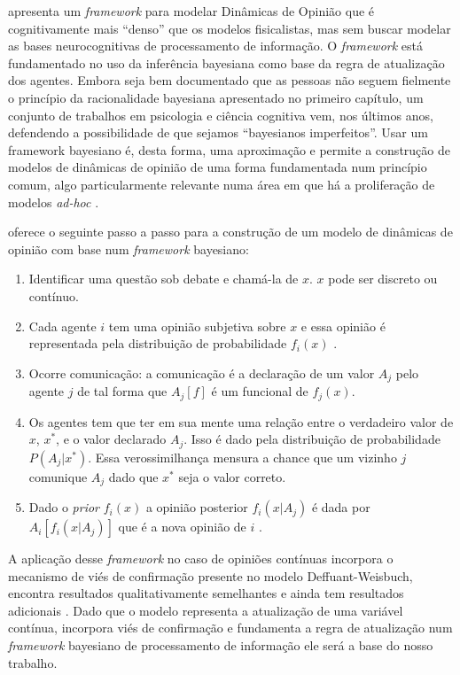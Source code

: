  apresenta um \textit{framework} para modelar
Dinâmicas de Opinião que é cognitivamente mais ``denso'' que os modelos
fisicalistas, mas sem buscar modelar as bases neurocognitivas de processamento
de informação. O \textit{framework} está fundamentado no uso da inferência
bayesiana como base da regra de atualização dos agentes. Embora seja bem
documentado que as pessoas não seguem fielmente o princípio da racionalidade
bayesiana apresentado no primeiro capítulo, um conjunto de trabalhos em
psicologia e ciência cognitiva vem, nos últimos anos, defendendo a possibilidade
de que sejamos ``bayesianos
imperfeitos''\cite{griffiths2006optimal,fujikawa2007perfect,baker2017rational,
  gintis2016individuality}. Usar um framework bayesiano é, desta forma, uma
aproximação e permite a construção de modelos de dinâmicas de opinião de uma
forma fundamentada num princípio comum, algo particularmente relevante numa área
em que há a proliferação de modelos \textit{ad-hoc} \cite{flache2017,jager2017}.

  oferece o seguinte passo a passo
para a construção de um modelo de dinâmicas de opinião com base num
\textit{framework} bayesiano:

\begin{enumerate}
\item Identificar uma questão sob debate e chamá-la de $x$. \(x\) pode ser
  discreto ou contínuo.
\item Cada agente \(i\) tem uma opinião subjetiva sobre $x$ e essa opinião é
  representada pela distribuição de probabilidade $f_i(x)$ .
\item Ocorre comunicação: a comunicação é a declaração de um valor
  $ A_j$ pelo agente $j$ de tal forma que $A_j[f]$ é um funcional de
  $f_j(x)$.
\item Os agentes tem que ter em sua mente  uma relação entre o
  verdadeiro valor de \(x\),  \(x^*\),   e o valor declarado $A_j$. Isso é dado
  pela distribuição de probabilidade $P(A_j|x^*)$. Essa verossimilhança  mensura
  a chance que um vizinho \(j\) comunique \(A_j\) dado que \(x^*\) seja o valor correto.
\item Dado o \textit{prior} $f_i(x)$ a opinião posterior $f_i(x|A_j)$ é dada
  por $A_i[f_i(x|A_j)]$ que é a nova opinião de $i$ .
\end{enumerate}





A aplicação desse \textit{framework} no caso de opiniões contínuas incorpora o
mecanismo de viés de confirmação presente no modelo Deffuant-Weisbuch, encontra
resultados qualitativamente semelhantes e ainda tem resultados adicionais
\cite{martins2009bayesian}. Dado que o modelo representa a atualização de uma
variável contínua, incorpora viés de confirmação e fundamenta a regra de
atualização num \textit{framework} bayesiano de processamento de informação ele será a
base do nosso trabalho.

